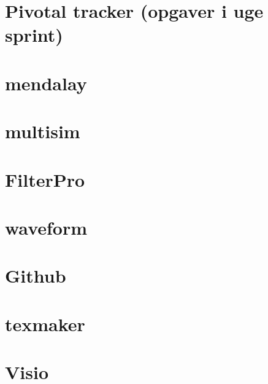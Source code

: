 \section{Pivotal tracker (opgaver i uge sprint)}
\section{mendalay}
\section{multisim}
\section{FilterPro}
\section{waveform}
\section{Github}
\section{texmaker}
\section{Visio}







%



